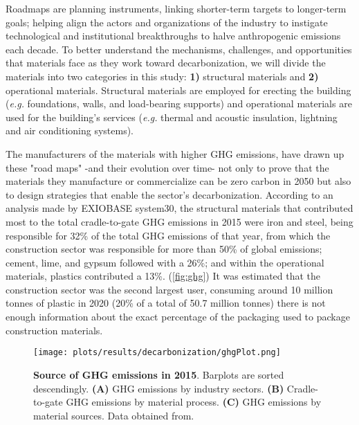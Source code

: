 Roadmaps are planning instruments, linking shorter-term targets to longer-term goals; helping align the actors and organizations of the industry to instigate technological and institutional breakthroughs to halve anthropogenic emissions each decade.\autocite{rockstrom2017roadmap} To better understand the mechanisms, challenges, and opportunities that materials face as they work toward decarbonization, we will divide the materials into two categories in this study: \textbf{1)} structural materials and \textbf{2)} operational materials. Structural materials are employed for erecting the building (\textit{e.g.} foundations, walls, and load-bearing supports) and operational materials are used for the building’s services (\textit{e.g.} thermal and acoustic insulation, lightning and air conditioning systems).

The manufacturers of the materials with higher GHG emissions, have drawn up these "road maps" -and their evolution over time- not only to prove that the materials they manufacture or commercialize can be zero carbon in 2050 but also to design strategies that enable the sector’s decarbonization.\autocite{aus_2022} According to an analysis made by EXIOBASE system30, the structural materials that contributed most to the total cradle-to-gate GHG emissions in 2015 were iron and steel, being responsible for 32\% of the total GHG emissions of that year, from which the construction sector was responsible for more than 50\% of global emissions;\autocite{worldsteelassociation_2020} cement, lime, and gypsum followed with a 26\%; and within the operational materials, plastics contributed a 13\%.\autocite{hertwich2019material} (\autoref{fig:ghg}) It was estimated that the construction sector was the second largest user, consuming around 10 million tonnes of plastic in 2020 (20\% of a total of 50.7 million tonnes\autocite{plasticseurpo_2021}) there is not enough information about the exact percentage of the packaging used to package construction materials.\autocite{geyer2017production}

\begin{figure}[ht!]
  \centering
  \texttt{[image: plots/results/decarbonization/ghgPlot.png]}
  \caption[Source of GHG emissions in 2015]{\textbf{Source of GHG emissions in 2015}. Barplots are sorted descendingly. \textbf{(A)}  GHG emissions by industry sectors. \textbf{(B)} Cradle-to-gate GHG emissions by material process. \textbf{(C)} GHG emissions by material sources. Data obtained from.\autocite{hertwich2021increased}}
  \label{fig:ghg}
\end{figure}


